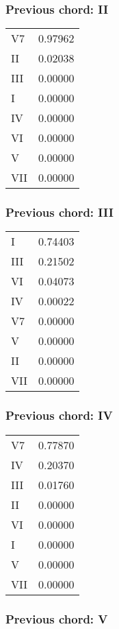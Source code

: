 \subsubsection*{Previous chord: II}


\begin{tabular}{l l}
V7 & 0.97962 \\
II & 0.02038 \\
III & 0.00000 \\
I & 0.00000 \\
IV & 0.00000 \\
VI & 0.00000 \\
V & 0.00000 \\
VII & 0.00000 \\
\end{tabular}


\subsubsection*{Previous chord: III}


\begin{tabular}{l l}
I & 0.74403 \\
III & 0.21502 \\
VI & 0.04073 \\
IV & 0.00022 \\
V7 & 0.00000 \\
V & 0.00000 \\
II & 0.00000 \\
VII & 0.00000 \\
\end{tabular}


\subsubsection*{Previous chord: IV}


\begin{tabular}{l l}
V7 & 0.77870 \\
IV & 0.20370 \\
III & 0.01760 \\
II & 0.00000 \\
VI & 0.00000 \\
I & 0.00000 \\
V & 0.00000 \\
VII & 0.00000 \\
\end{tabular}


\subsubsection*{Previous chord: V}


